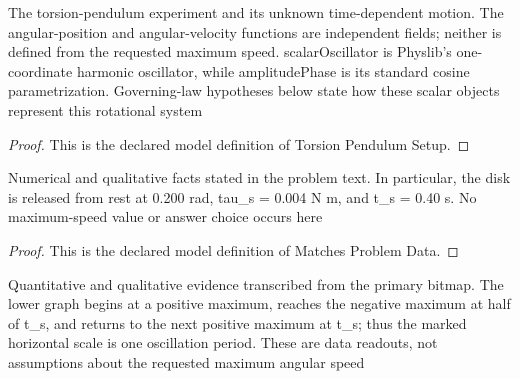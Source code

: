 \begin{definition}
  \label{def:physics:phyx-mini-0278:phyxminiproblems-problemphyxmini0278-torsionpendulumsetup}
  The torsion-pendulum experiment and its unknown time-dependent motion. The angular-position and angular-velocity functions are independent fields; neither is defined from the requested maximum speed. scalarOscillator is Physlib's one-coordinate harmonic oscillator, while amplitudePhase is its standard cosine parametrization. Governing-law hypotheses below state how these scalar objects represent this rotational system
\end{definition}
\begin{proof}
  This is the declared model definition of Torsion Pendulum Setup.
\end{proof}
\begin{definition}
  \label{def:physics:phyx-mini-0278:phyxminiproblems-problemphyxmini0278-matchesproblemdata}
  Numerical and qualitative facts stated in the problem text. In particular, the disk is released from rest at 0.200 rad, tau\_s = 0.004 N m, and t\_s = 0.40 s. No maximum-speed value or answer choice occurs here
\end{definition}
\begin{proof}
  This is the declared model definition of Matches Problem Data.
\end{proof}
\begin{definition}
  \label{def:physics:phyx-mini-0278:phyxminiproblems-problemphyxmini0278-matchessuppliedfigure}
  Quantitative and qualitative evidence transcribed from the primary bitmap. The lower graph begins at a positive maximum, reaches the negative maximum at half of t\_s, and returns to the next positive maximum at t\_s; thus the marked horizontal scale is one oscillation period. These are data readouts, not assumptions about the requested maximum angular speed
\end{definition}
